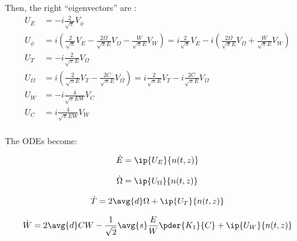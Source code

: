 Then, the right ``eigenvectors'' are :
\begin{equation}
\begin{split}
U_E &= - i \frac{2}{\sqrt{\pi}} V_\phi\\
U_{\phi} & =  i \left(\frac{2}{\sqrt{\pi}} V_E - \frac{2\Omega}{\sqrt{\pi} E} V_{\Omega} -  \frac{W}{\sqrt{\pi} E} V_W \right)=  i\frac{2}{\sqrt{\pi}} V_E - i\left( \frac{2\Omega}{\sqrt{\pi} E} V_{\Omega} +  \frac{W}{\sqrt{\pi} E} V_W \right)\\
U_T &=  -i\frac{2}{\sqrt{\pi} E} V_{\Omega}\\
U_\Omega &=  i\left(\frac{2}{\sqrt{\pi}E }V_T  - \frac{2C}{\sqrt{\pi}E }V_\Omega\right) = i \frac{2}{\sqrt{\pi}E } V_T  - i\frac{2C}{\sqrt{\pi}E }V_\Omega  \\
U_{W} &= -i \frac{4}{ \sqrt{\pi}E W }V_{C}\\
U_C &= i\frac{4}{\sqrt{\pi}EW} V_W\\
\end{split}
\end{equation}

The ODEs become:

\begin{equation}
\begin{split}
\dot{E} &=  \ip{U_E}{n(t,z)} \\
\end{split}
\end{equation}

\begin{equation}
\begin{split}
 \dot{\Omega} & =   \ip{U_\Omega}{n(t,z)} \\
\end{split}
\end{equation}

\begin{equation}
\begin{split}
 \dot{T} =  2\avg{d} \Omega + \ip{ U_T }{ n(t,z)} \\
\end{split}
\end{equation}

\begin{equation}
\begin{split}
 \dot{W} &=  2 \avg{d} C W - \frac{1}{\sqrt{2}} \avg{s} \frac{E}{W} \pder{K_1}{C} + \ip{U_W}{ n(t,z)}\\ 
\end{split}
\end{equation}

